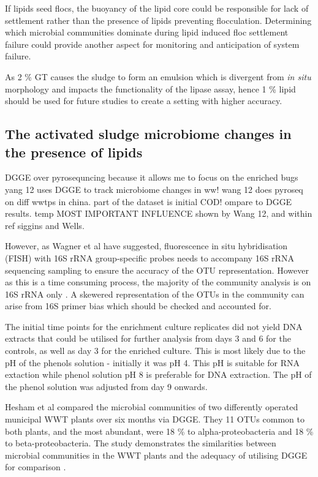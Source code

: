 \documentclass[11pt]{article}
\begin{document}
If lipids seed flocs, the buoyancy of the lipid core could be responsible for lack of settlement rather than the presence of lipids preventing flocculation. Determining which microbial communities dominate during lipid induced floc settlement failure could provide another aspect for monitoring and anticipation of system failure.


As 2 \% GT causes the sludge to form an emulsion which is divergent from \emph{in situ} morphology and impacts the functionality of the lipase assay, hence 1 \% lipid should be used for future studies to create a setting with higher accuracy.


\subsection{The activated sludge microbiome changes in the presence of lipids}
DGGE over pyrosequncing because it allows me to focus on the enriched bugs
yang 12 uses DGGE to track microbiome changes in ww!
wang 12 does pyroseq on diff wwtps in china. part of the dataset is initial COD! ompare to DGGE results. temp MOST IMPORTANT INFLUENCE shown by Wang 12, and within ref siggins and Wells.

However, as Wagner et al have suggested, fluorescence in situ hybridisation (FISH) with 16S rRNA  group-specific probes needs to accompany 16S rRNA sequencing sampling to ensure the accuracy of the OTU representation. However as this is a time consuming process, the majority of the community analysis is on 16S rRNA only \cite{Wagner_02} . A skewered representation of the OTUs in the community can arise from 16S primer bias which should be checked and accounted for.

The initial time points for the enrichment culture replicates did not yield DNA extracts that could be utilised for further analysis from days 3 and 6 for the controls, as well as day 3 for the enriched culture. This is most likely due to the pH of the phenols solution - initially it was pH 4. This pH is suitable for RNA extaction while phenol solution pH 8 is preferable for DNA extraction. The pH of the phenol solution was adjusted from day 9 onwards.

Hesham et al compared the microbial communities of two differently operated municipal WWT plants over six months via DGGE. They 11 OTUs common to both plants, and the most abundant, were 18 \% to alpha-proteobacteria and 18 \% to beta-proteobacteria. The study demonstrates the similarities between microbial communities in the WWT plants and the adequacy of utilising DGGE for comparison \cite{Hesham_11}.
\end{document}
